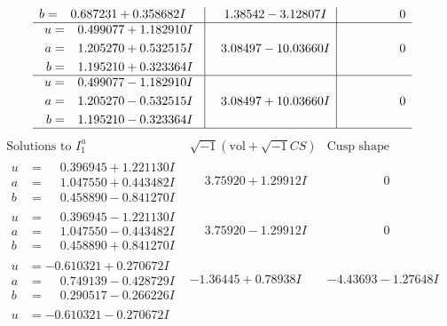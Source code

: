 \documentclass[1p]{elsarticle_modified}
\theoremstyle{definition}
\newcommand{\I}{\sqrt{-1}}
\begin{document}
$$\begin{array}{c|c|c}
\begin{aligned}
b &= \phantom{-}0.687231 + 0.358682 I\end{aligned}
 & \phantom{-}1.38542 - 3.12807 I & \phantom{-0.000000 } 0 \\ \hline\begin{aligned}
u &= \phantom{-}0.499077 + 1.182910 I \\
a &= \phantom{-}1.205270 + 0.532515 I \\
b &= \phantom{-}1.195210 + 0.323364 I\end{aligned}
 & \phantom{-}3.08497 - 10.03660 I & \phantom{-0.000000 } 0 \\ \hline\begin{aligned}
u &= \phantom{-}0.499077 - 1.182910 I \\
a &= \phantom{-}1.205270 - 0.532515 I \\
b &= \phantom{-}1.195210 - 0.323364 I\end{aligned}
 & \phantom{-}3.08497 + 10.03660 I & \phantom{-0.000000 } 0\\
 \hline 
 \end{array}$$\newpage$$\begin{array}{c|c|c}  
\text{Solutions to }I^u_{1}& \I (\text{vol} + \sqrt{-1}CS) & \text{Cusp shape}\\
 \hline 
\begin{aligned}
u &= \phantom{-}0.396945 + 1.221130 I \\
a &= \phantom{-}1.047550 + 0.443482 I \\
b &= \phantom{-}0.458890 - 0.841270 I\end{aligned}
 & \phantom{-}3.75920 + 1.29912 I & \phantom{-0.000000 } 0 \\ \hline\begin{aligned}
u &= \phantom{-}0.396945 - 1.221130 I \\
a &= \phantom{-}1.047550 - 0.443482 I \\
b &= \phantom{-}0.458890 + 0.841270 I\end{aligned}
 & \phantom{-}3.75920 - 1.29912 I & \phantom{-0.000000 } 0 \\ \hline\begin{aligned}
u &= -0.610321 + 0.270672 I \\
a &= \phantom{-}0.749139 - 0.428729 I \\
b &= \phantom{-}0.290517 - 0.266226 I\end{aligned}
 & -1.36445 + 0.78938 I & -4.43693 - 1.27648 I \\ \hline\begin{aligned}
u &= -0.610321 - 0.270672 I \\

\end{aligned}
\end{array}$$
\end{document}
